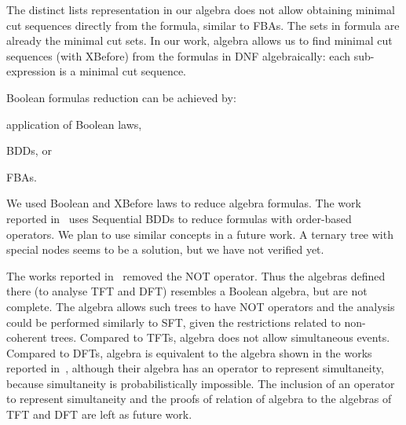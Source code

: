 %
%
%
%

The distinct lists representation in our algebra does not allow obtaining minimal cut sequences directly from the formula, similar to \acp{FBA}.
The sets in  formula are already the minimal cut sets.
In our work, \ac{algebra} allows us to find minimal cut sequences (with \ac{XBefore}) from the formulas in \ac{DNF} algebraically: each sub-expression is a minimal cut sequence.

Boolean formulas reduction can be achieved by: 
\begin{alineasinline}
  \item application of Boolean laws, 
  \item \acp{BDD}, or 
  \item \acp{FBA}.
\end{alineasinline}
%
We used Boolean and \ac{XBefore} laws to reduce \ac{algebra} formulas.
%
The work reported in~\cite{TXD2011,XTD2012} uses Sequential BDDs to reduce formulas with order-based operators.
%
We plan to use similar concepts in a future work.
A ternary tree with special nodes seems to be a solution, but we have not verified yet.

The works reported in~\cite{Merle2010,MRL+2010,MRL2011,Walker2009,WP2009} removed the \ac{NOT} operator.
Thus the algebras defined there (to analyse \ac{TFT} and \ac{DFT}) resembles a Boolean algebra, but are not complete. 
The \ac{algebra} allows such trees to have \ac{NOT} operators and the analysis could be performed similarly to \ac{SFT}, given the restrictions related to non-coherent trees.
Compared to \acp{TFT}, \ac{algebra} does not allow simultaneous events.
Compared to \acp{DFT}, \ac{algebra} is equivalent to the algebra shown in the works reported in~\cite{MRL2011b,Merle2010}, although their algebra has an operator to represent simultaneity, because simultaneity is probabilistically impossible.
The inclusion of an operator to represent simultaneity and the proofs of relation of \ac{algebra} to the algebras of \ac{TFT} and \ac{DFT} are left as future work.

